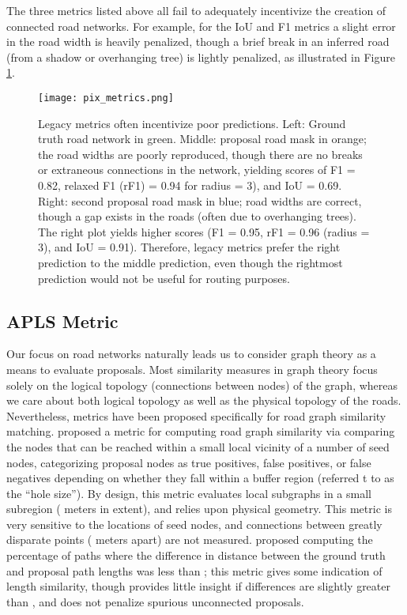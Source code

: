 \documentclass{article}
\begin{document}
The three metrics listed above all fail to adequately incentivize the creation of connected road networks. For example, for the IoU and F1 metrics a slight error in the road width is heavily penalized, though a brief break in an inferred road (from a shadow or overhanging tree) is lightly penalized, as illustrated in Figure \ref{fig:pix_metrics}.  


\begin{figure}
  \centering
     \texttt{[image: pix\_metrics.png]}
  \caption{Legacy metrics often incentivize poor predictions.  Left: Ground truth road network in green.  Middle: proposal road mask in orange; the road widths are poorly reproduced, though there are no breaks or extraneous connections in the network, yielding scores of F1 = 0.82, relaxed F1 (rF1) = 0.94 for radius = 3), and IoU = 0.69.  Right: second proposal road mask in blue; road widths are correct, though a gap exists in the roads (often due to overhanging trees).  The right plot yields higher scores (F1 = 0.95, rF1 = 0.96 (radius = 3), and IoU = 0.91).  Therefore, legacy metrics prefer the right prediction to the middle prediction, even though the rightmost prediction would not be useful for routing purposes.}
  \label{fig:pix_metrics}
\end{figure}

\subsection{APLS Metric}

Our focus on road networks naturally leads us to consider graph theory as a means to evaluate proposals. Most similarity measures in graph theory focus solely on the logical topology (connections between nodes) of the graph, whereas we care about both logical topology as well as the physical topology of the roads.  Nevertheless, metrics have been proposed specifically for road graph similarity matching.  \cite{topo_metric} proposed a metric for computing road graph similarity via comparing the nodes that can be reached within a small local vicinity of a number of seed nodes, categorizing proposal nodes as true positives, false positives, or false negatives depending on whether they fall within a buffer region (referred t to as the ``hole size''). By design, this metric evaluates local subgraphs in a small subregion ( meters in extent), and relies upon physical geometry.  This metric is very sensitive to the locations of seed nodes, and connections between greatly disparate points ( meters apart) are not measured. 
\cite{5perc_metric} proposed computing the percentage of paths where the difference in distance between the ground truth and proposal path lengths was less than ; this metric gives some indication of length similarity, though provides little insight if differences are slightly greater than , and does not penalize spurious unconnected proposals.
\end{document}
